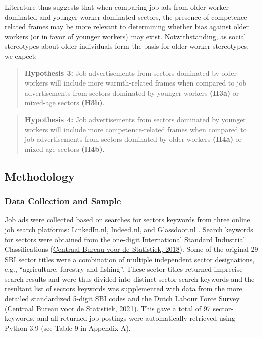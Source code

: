 \documentclass[
  12pt,
  letterpaper,
  DIV=11,
  numbers=noendperiod]{scrartcl}
\begin{document}
Literature thus suggests that when comparing job ads from
older-worker-dominated and younger-worker-dominated sectors, the
presence of competence-related frames may be more relevant to
determining whether bias against older workers (or in favor of younger
workers) may exist. Notwithstanding, as social stereotypes about older
individuals form the basis for older-worker stereotypes, we expect:

\begin{quote}
\textbf{Hypothesis 3:} Job advertisements from sectors dominated by
older workers will include more warmth-related frames when compared to
job advertisements from sectors dominated by younger workers
\textbf{(H3a)} or mixed-age sectors \textbf{(H3b)}.
\end{quote}

\begin{quote}
\textbf{Hypothesis 4:} Job advertisements from sectors dominated by
younger workers will include more competence-related frames when
compared to job advertisements from sectors dominated by older workers
\textbf{(H4a)} or mixed-age sectors \textbf{(H4b)}.
\end{quote}

\hypertarget{method}{%
\subsection{Methodology}\label{method}}

\hypertarget{sampling}{%
\subsubsection{Data Collection and Sample}\label{sampling}}

Job ads were collected based on searches for sectors keywords from three
online job search platforms: LinkedIn.nl, Indeed.nl, and Glassdoor.nl .
Search keywords for sectors were obtained from the one-digit
International Standard Industrial Classifications
(\protect\hyperlink{ref-centraal_bureau_voor_de_statistiek_standard_2018}{Centraal
Bureau voor de Statistiek, 2018}). Some of the original 29 SBI sector
titles were a combination of multiple independent sector designations,
e.g., ``agriculture, forestry and fishing''. These sector titles
returned imprecise search results and were thus divided into distinct
sector search keywords and the resultant list of sectors keywords was
supplemented with data from the more detailed standardized 5-digit SBI
codes and the Dutch Labour Force Survey
(\protect\hyperlink{ref-centraal_bureau_voor_de_statistiek_dutch_2021}{Centraal
Bureau voor de Statistiek, 2021}). This gave a total of 97
sector-keywords, and all returned job postings were automatically
retrieved using Python 3.9 (see Table 9 in Appendix A).
\end{document}
